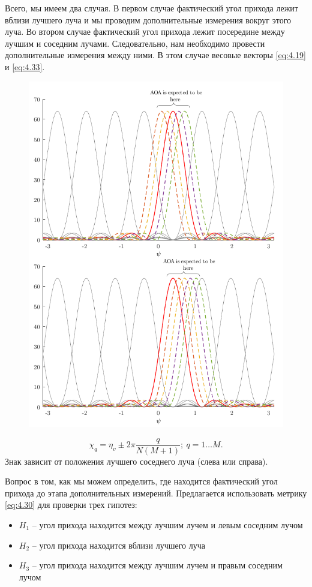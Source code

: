 Всего, мы имеем два случая. В первом случае фактический угол прихода лежит
вблизи лучшего луча и мы проводим дополнительные измерения вокруг этого луча.
Во втором случае фактический угол прихода лежит посередине между лучшим и соседним
лучами. Следовательно, нам необходимо провести дополнительные измерения между ними.
В этом случае весовые векторы  \eqref{eq:4.19} и \eqref{eq:4.33}.
\begin{figure}[ht]
    \centering
    \includegraphics{figs/fig4.12}
    \caption{}
    \label{fig:4.12}
\end{figure}

\begin{equation}
    \label{eq:4.33}
    \chi_q = \eta_v \pm 2\pi \frac{q}{N(M+1)}; ~ q = 1 \dots M.
\end{equation}
Знак зависит от положения лучшего соседнего луча (слева или справа).

Вопрос в том, как мы можем определить, где находится фактический угол прихода до этапа дополнительных измерений.
Предлагается использовать метрику \eqref{eq:4.30} для проверки трех гипотез:
\begin{itemize}
    \item $H_1$ -- угол прихода находится между лучшим лучем и левым соседним лучом
    \item $H_2$ -- угол прихода находится вблизи лучшего луча
    \item $H_3$ -- угол прихода находится между лучшим лучем и правым соседним лучом
\end{itemize}

